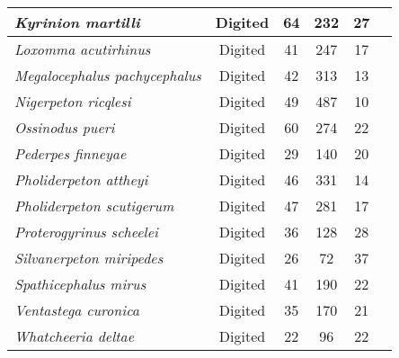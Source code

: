 \begin{tabular}{|L{4.5cm}|c|c|c|c|L{4.5cm}|}
\textit{Kyrinion martilli}&Digited&64&232&27&\cite{Clac03a}\\\hline
\textit{Loxomma acutirhinus}&Digited&41&247&17&\cite{Beau77a}\\\hline
\textit{Megalocephalus pachycephalus}&Digited&42&313&13&\cite{Beau77a}\\\hline
\textit{Nigerpeton ricqlesi}&Digited&49&487&10&\cite{Sido05a}\\\hline
\textit{Ossinodus pueri}&Digited&60&274&22&\cite{Warr04a,Warr07a}\\\hline
\textit{Pederpes finneyae}&Digited&29&140&20&\cite{Clac04a}\\\hline
\textit{Pholiderpeton attheyi}&Digited&46&331&14&\cite{Panc72a}\\\hline
\textit{Pholiderpeton scutigerum}&Digited&47&281&17&\cite{Clac87a}\\\hline
\textit{Proterogyrinus scheelei}&Digited&36&128&28&\cite{Holm84a}\\\hline
\textit{Silvanerpeton miripedes}&Digited&26&72&37&\cite{Ruta06a}\\\hline
\textit{Spathicephalus mirus}&Digited&41&190&22&\cite{Beau98a}\\\hline
\textit{Ventastega curonica}&Digited&35&170&21&\cite{Ahlb08a}\\\hline
\textit{Whatcheeria deltae}&Digited&22&96&22&\cite{Lomb95a}\\\hline
\end{tabular}

